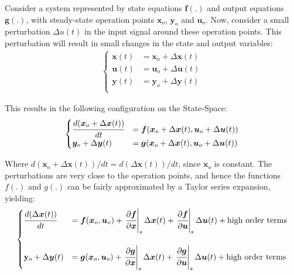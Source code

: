 \documentclass[a4paper,11pt]{book}
\numberwithin{figure}{chapter}
\numberwithin{equation}{chapter}
\numberwithin{table}{chapter}
\theoremstyle{definition}
\begin{document}
Consider a system represented by state equations $\bm{f}(.)$ and output equations $\bm{g}(.)$, with steady-state operation points $\bm{x}_o$, $\bm{y}_o$ and $\bm{u}_o$. Now, consider a small perturbation $\Delta u(t)$ in the input signal around these operation points. This perturbation will result in small changes in the state and output variables:
\begin{align}
\begin{cases}
	\bm{x}(t) &= \bm{x}_o + \Delta \bm{x}(t) \\
	\bm{u}(t) &= \bm{u}_o + \Delta \bm{u}(t) \\
	\bm{y}(t) &= \bm{y}_o + \Delta \bm{y}(t) \\
\end{cases}
\end{align}

This results in the following configuration on the State-Space:
\begin{align}
\begin{cases}
	\cfrac{d(\bm{x}_o + \Delta \bm{x}(t))}{dt} &= \bm{f}(\bm{x}_o + \Delta \bm{x}(t), \bm{u}_o + \Delta \bm{u}(t) ) \\
	\bm{y}_o + \Delta \bm{y}(t) &= \bm{g}(\bm{x}_o + \Delta \bm{x}(t), \bm{u}_o + \Delta \bm{u}(t) ) \\
\end{cases}
\end{align}

Where $d(\bm{x}_o + \Delta \bm{x}(t)) / dt = d(\Delta \bm{x}(t)) / dt$, since $\bm{x}_o$ is constant. The perturbations are very close to the operation points, and hence the functions $f(.)$ and $g(.)$ can be fairly approximated by a Taylor series expansion, yielding:
\begin{align}
\begin{cases}
	\cfrac{d(\Delta \bm{x}(t))}{dt} &= \bm{f}(\bm{x}_o, \bm{u}_o) + \left. \cfrac{\partial \bm{f}}{\partial \bm{x}}\right\vert_{s} \Delta \bm{x}(t) + \left. \cfrac{\partial \bm{f}}{\partial \bm{u}}\right\vert_{s}  \Delta \bm{u}(t) + \text{high order terms} \\ \\
	\mathbf{y}_o + \Delta \bm{y}(t) &= \bm{g}(\bm{x}_o, \bm{u}_o) + \left. \cfrac{\partial \bm{g}}{\partial \bm{x}}\right\vert_{s} \Delta \bm{x}(t) + \left. \cfrac{\partial \bm{g}}{\partial \bm{u}}\right\vert_{s}  \Delta \bm{u}(t) + \text{high order terms} \\
\end{cases}
\end{align}
\end{document}

